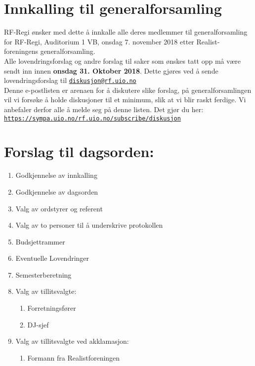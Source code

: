 \documentclass[a4paper]{article}
\begin{document}
\section*{\textsf{\textbf{\huge Innkalling til generalforsamling}}}
\vspace{1cm}

RF-Regi ønsker med dette å innkalle alle deres medlemmer til generalforsamling
for RF-Regi, Auditorium 1 VB, onsdag 7. november 2018 etter
    Realist-foreningens generalforsamling. \\

Alle lovendringsforslag og andre forslag til saker som ønskes tatt opp må
være sendt inn innen \textbf{onsdag 31. Oktober 2018}. Dette gjøres ved å sende
lovendringsforslag til
\href{mailto:diskusjon@rf.uio.no}{\texttt{diskusjon@rf.uio.no}} \\

Denne e-postlisten er arenaen for å diskutere slike forslag, på generalforsamlingen vil vi
forsøke å holde diskusjoner til et minimum, slik at vi blir raskt ferdige.
Vi anbefaler derfor alle å melde seg på denne listen. Det gjør du her:\\
\texttt{\url{https://sympa.uio.no/rf.uio.no/subscribe/diskusjon}}\\

\section*{\textsf{Forslag til dagsorden:}}
\begin{enumerate}
    \item Godkjennelse av innkalling
    \item Godkjennelse av dagsorden
    \item Valg av ordstyrer og referent
    \item Valg av to personer til å underskrive protokollen
    \item Budsjettrammer
    \item Eventuelle Lovendringer
    \item Semesterberetning
    \item Valg av tillitsvalgte:
    \begin{enumerate}
        \item Forretningsfører
        \item DJ-sjef
    \end{enumerate}
    \item Valg av tillitsvalgte ved akklamasjon:
    \begin{enumerate}
        \item Formann fra Realistforeningen
    \end{enumerate}
\end{enumerate}
\end{document}
